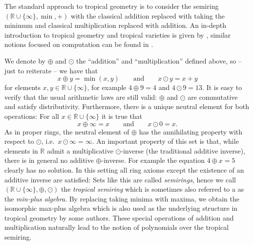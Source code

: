 \documentclass[
  paper=a4,
  titlepage,
  bibliography=totoc,
  listof=totoc,
  pagesize=pdftex
]{scrartcl}
\numberwithin{figure}{section}
\numberwithin{equation}{section}
\numberwithin{table}{section}
\newcommand*\setR{\mathds{R}}
\theoremstyle{definition}
\numberwithin{definition}{section}
\begin{document}
The standard approach to tropical geometry is to consider the semiring $(\setR \cup
\{\infty\}, \min, +)$ with the classical addition replaced with taking the minimum and
classical multiplication replaced with addition. An in-depth introduction to tropical
geometry and tropical varieties is given by \cite{sturmMacTrop}, similar notions focused
on computation can be found in \cite{compTropVar}.

We denote by $\oplus$ and $\odot$ the \enquote{addition} and \enquote{multiplication}
defined above, so -- just to reiterate -- we have that
\[
  x \oplus y = \min(x,y)
  \qquad \text{and} \qquad
  x \odot y = x+y
\]
for elements $x,y\in \setR\cup\{\infty\}$, for example $4\oplus9 = 4$ and $4\odot9 = 13$.
It is easy to verify that the usual arithmetic laws are still valid: $\oplus$ and $\odot$
are commutative and satisfy distributivity. Furthermore, there is a unique neutral
element for both operations: For all $x\in \setR\cup \{\infty\}$ it is true that
\[
  x \oplus \infty = x
  \qquad \text{and} \qquad
  x \odot 0 = x.
\]
As in proper rings, the neutral element of $\oplus$ has the annihilating property with
respect to $\odot$, i.e.\ $x\odot \infty = \infty$. An important property of this set is
that, while elements in $\setR$ admit a multiplicative $\odot$-inverse (the traditional
additive inverse), there is in general no additive $\oplus$-inverse. For example the
equation $4\oplus x = 5$ clearly has no solution. In this setting all ring axioms except
the existence of an additive inverse are satisfied: Sets like this are called
\emph{semirings}, hence we call $(\setR\cup \{\infty\}, \oplus, \odot)$ the \emph{tropical
semiring} which is sometimes also referred to a as the \emph{min-plus algebra}. By
replacing taking minima with maxima, we obtain the isomorphic max-plus algebra which is
also used as the underlying structure in tropical geometry by some authors. These special
operations of addition and multiplication naturally lead to the notion of polynomials over
the tropical semiring.
\end{document}
